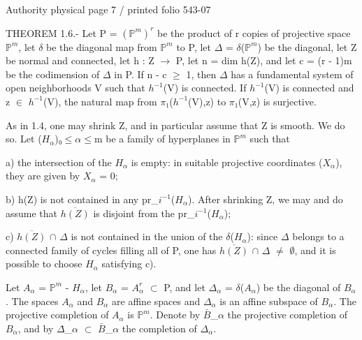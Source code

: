 \documentclass[10pt,a4paper]{article}
\begin{document}
\noindent\begin{adjustbox}{max totalsize={\textwidth}{0.945\textheight},center}
\begin{minipage}{\textwidth}
\noindent\hfill\scriptsize Authority physical page 7 / printed folio 543-07\par\normalsize
\noindent THEOREM 1.6.- Let P = \ensuremath{(ℙ^m)^r} be the product of r copies of projective space \ensuremath{ℙ^m}, let \ensuremath{δ} be the diagonal map from \ensuremath{ℙ^m} to P, let \ensuremath{Δ} = \ensuremath{δ}(\ensuremath{ℙ^m}) be the diagonal, let Z be normal and connected, let h : Z \ensuremath{→} P, let n = dim h(Z), and let c = (r - 1)m be the codimension of \ensuremath{Δ} in P. If n - c \ensuremath{≥} 1, then \ensuremath{Δ} has a fundamental system of open neighborhoods V such that \ensuremath{h^{-1}}(V) is connected. If \ensuremath{h^{-1}}(V) is connected and z \ensuremath{∈} \ensuremath{h^{-1}}(V), the natural map from \ensuremath{π₁}(\ensuremath{h^{-1}}(V),z) to \ensuremath{π₁}(V,z) is surjective.\par\smallskip
\noindent As in 1.4, one may shrink Z, and in particular assume that Z is smooth. We do so. Let (\ensuremath{H_α})\ensuremath{₀≤α≤}m be a family of hyperplanes in \ensuremath{ℙ^m} such that\par\smallskip
\noindent a) the intersection of the \ensuremath{H_α} is empty: in suitable projective coordinates (\ensuremath{X_α}), they are given by \ensuremath{X_α} = 0;\par\smallskip
\noindent b) h(Z) is not contained in any pr\allowbreak\_\ensuremath{i^{-1}}(\ensuremath{H_α}). After shrinking Z, we may and do assume that \ensuremath{\overline{h(Z)}} is disjoint from the pr\allowbreak\_\ensuremath{i^{-1}}(\ensuremath{H_α});\par\smallskip
\noindent c) \ensuremath{\overline{h(Z)}} \ensuremath{∩} \ensuremath{Δ} is not contained in the union of the \ensuremath{δ}(\ensuremath{H_α}): since \ensuremath{Δ} belongs to a connected family of cycles filling all of P, one has \ensuremath{\overline{h(Z)}} \ensuremath{∩} \ensuremath{Δ} \ensuremath{≠} \ensuremath{∅}, and it is possible to choose \ensuremath{H_α} satisfying c).\par\smallskip
\noindent Let \ensuremath{A_α} = \ensuremath{ℙ^m} - \ensuremath{H_α}, let \ensuremath{B_α} = \ensuremath{A_α^r} \ensuremath{⊂} P, and let \ensuremath{Δ_α} = \ensuremath{δ}(\ensuremath{A_α}) be the diagonal of \ensuremath{B_α}. The spaces \ensuremath{A_α} and \ensuremath{B_α} are affine spaces and \ensuremath{Δ_α} is an affine subspace of \ensuremath{B_α}. The projective completion of \ensuremath{A_α} is \ensuremath{ℙ^m}. Denote by \ensuremath{\bar{B}}\allowbreak\_\ensuremath{α} the projective completion of \ensuremath{B_α}, and by \ensuremath{Δ}̄\allowbreak\_\ensuremath{α} \ensuremath{⊂} \ensuremath{\bar{B}}\allowbreak\_\ensuremath{α} the completion of \ensuremath{Δ_α}.\par\smallskip

\end{minipage}
\end{adjustbox}
\end{document}
